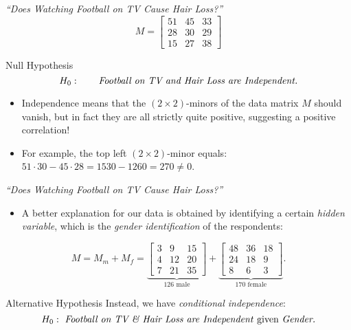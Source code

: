 \begin{frame}{\emph{``Does Watching Football on TV Cause Hair Loss?''}}
    $$ M = \begin{bmatrix} 
    51 & 45 & 33 \\ 
    28 & 30 & 29 \\ 
    15 & 27 & 38
    \end{bmatrix} $$

    \begin{block}{Null Hypothesis}
    \vspace*{-18pt}
        \begin{equation*}
            H_{0}: \qquad \text{\emph{Football on TV and Hair Loss are Independent.}}
        \end{equation*}
    \vspace*{-18pt}
    \end{block}

    \begin{itemize}
        \item Independence means that the $(2 \times 2)$-minors of the data matrix $M$ should vanish, but in fact they are all strictly quite positive, suggesting a positive correlation!
        \item For example, the top left $(2 \times 2)$-minor equals: $51 \cdot 30 - 45 \cdot 28 = 1530 - 1260 = 270 \neq 0$.
    \end{itemize}

\end{frame}

\begin{frame}{\emph{``Does Watching Football on TV Cause Hair Loss?''}}

    \begin{itemize}
        \item A better explanation for our data is obtained by identifying a certain \emph{hidden variable}, which is the \emph{gender identification} of the respondents:
    \end{itemize}

    $$ M  = M_{m} + M_{f} = 
    \underbrace{\begin{bmatrix} 
    3 & 9 & 15 \\ 
    4 & 12 & 20 \\ 
    7 & 21 & 35
    \end{bmatrix}}_{126 \text{ male}} + 
    \underbrace{\begin{bmatrix} 
    48 & 36 & 18 \\
    24 & 18 & 9 \\
    8 & 6 & 3
    \end{bmatrix}}_{170 \text{ female}}.  $$

    \begin{block}{Alternative Hypothesis}
        Instead, we have \emph{conditional independence}:
        \begin{equation*}
            H_{0}: \text{ \emph{Football on TV \& Hair Loss are Independent} given \emph{Gender.}}
        \end{equation*}
    \end{block}

\end{frame}
